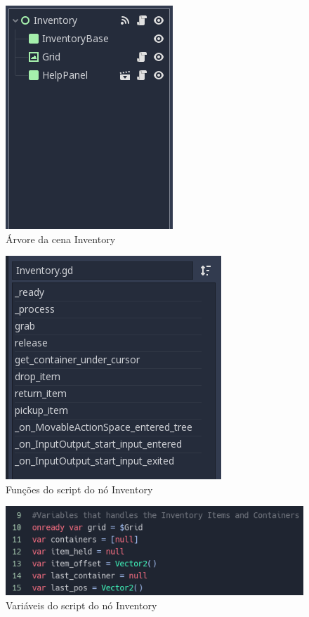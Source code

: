 \begin{minipage}[c]{0.5\textwidth}
    \begin{figure}[H]
        \includegraphics[scale=0.6]{../figuras/cena_inventory.png}
        \caption{Árvore da cena Inventory}
    \end{figure}
\end{minipage}%
\begin{minipage}[c]{0.5\textwidth}
    \begin{figure}[H]
        \includegraphics[scale=0.6]{../figuras/funcoes_inventory.png}
        \caption{Funções do script do nó Inventory}
    \end{figure}
\end{minipage}

\begin{figure}[H]
    \includegraphics[scale=0.7]{../figuras/variaveis_inventory.png}
    \caption{Variáveis do script do nó Inventory}
\end{figure}

